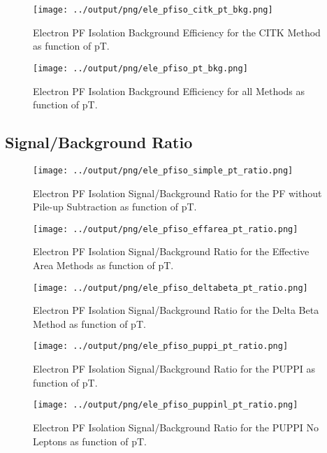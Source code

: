 \documentclass[11pt]{book}
\begin{document}
\begin{figure}[htb]
\centering
\texttt{[image: ../output/png/ele\_pfiso\_citk\_pt\_bkg.png]}
\caption{Electron PF Isolation Background Efficiency for the CITK Method as function of pT.}
\label{fig:ele_pfiso_pt_bkg_citk}
\end{figure}

\begin{figure}[htb]
\centering
\texttt{[image: ../output/png/ele\_pfiso\_pt\_bkg.png]}
\caption{Electron PF Isolation Background Efficiency for all Methods as function of pT.}
\label{fig:ele_pfiso_pt_bkg}
\end{figure}
\clearpage


\subsection{Signal/Background Ratio}
\begin{figure}[htb]
\centering
\texttt{[image: ../output/png/ele\_pfiso\_simple\_pt\_ratio.png]}
\caption{Electron PF Isolation Signal/Background Ratio for the PF without Pile-up Subtraction as function of pT.}
\label{fig:ele_pfiso_pt_ratio_simple}
\end{figure}

\begin{figure}[htb]
\centering
\texttt{[image: ../output/png/ele\_pfiso\_effarea\_pt\_ratio.png]}
\caption{Electron PF Isolation Signal/Background Ratio for the Effective Area Methods as function of pT.}
\label{fig:ele_pfiso_pt_ratio_effarea}
\end{figure}

\begin{figure}[htb]
\centering
\texttt{[image: ../output/png/ele\_pfiso\_deltabeta\_pt\_ratio.png]}
\caption{Electron PF Isolation Signal/Background Ratio for the Delta Beta Method as function of pT.}
\label{fig:ele_pfiso_pt_ratio_deltabeta}
\end{figure}

\begin{figure}[htb]
\centering
\texttt{[image: ../output/png/ele\_pfiso\_puppi\_pt\_ratio.png]}
\caption{Electron PF Isolation Signal/Background Ratio for the PUPPI as function of pT.}
\label{fig:ele_pfiso_pt_ratio_puppi}
\end{figure}

\begin{figure}[htb]
\centering
\texttt{[image: ../output/png/ele\_pfiso\_puppinl\_pt\_ratio.png]}
\caption{Electron PF Isolation Signal/Background Ratio for the PUPPI No Leptons as function of pT.}
\label{fig:ele_pfiso_pt_ratio_puppinl}
\end{figure}
\end{document}
